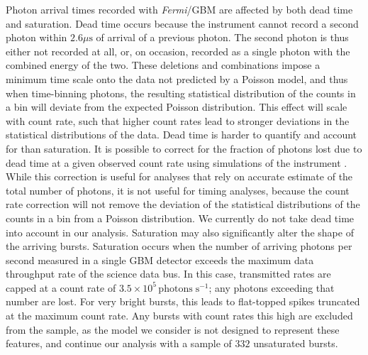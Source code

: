 \documentclass[12pt]{emulateapj}
\newcommand{\project}[1]{\textsl{#1}}
\newcommand{\fermi}{\project{Fermi}}
\begin{document}
Photon arrival times recorded with \fermi/GBM are affected by both dead time and saturation. 
Dead time occurs because the instrument cannot record a second photon within $2.6\mu\mathrm{s}$ of arrival of a previous photon. 
The second photon is thus either not recorded at all, or, on occasion, recorded as a single photon with the combined energy of the two. These deletions and combinations 
impose a minimum time scale onto the data not predicted by a Poisson model, and thus when time-binning photons, the resulting statistical distribution of the counts in a bin will
deviate from the expected Poisson distribution. This effect will scale with count rate, such that higher count rates lead to stronger deviations in the statistical distributions of the data.
Dead time is harder to quantify and account for than saturation. It is possible to correct for the fraction of photons lost due to dead time at a given observed count rate using simulations of the instrument \citep{meegan2009,briggs2010,chaplin2013}. While this correction is useful for analyses that rely on accurate estimate of the total number of photons, it is not useful for timing analyses, because the count rate correction will not remove the deviation of the statistical distributions of the counts in a bin from a Poisson distribution. 
We currently do not take dead time into account in our analysis. Saturation may also significantly alter the shape of the arriving bursts. Saturation occurs when the number of arriving photons per second
measured in a single GBM detector exceeds the maximum data throughput rate of the science data bus. In this case, transmitted rates are capped at a 
count rate of $3.5 \times 10^{5} \, \mathrm{photons} \; \mathrm{s}^{-1}$; any photons exceeding that number are lost. For very bright bursts, this leads
to flat-topped spikes truncated at the maximum count rate. Any bursts with count rates this high are excluded from the sample, as the model we
consider is not designed to represent these features, and continue our analysis with a sample of $332$ unsaturated bursts.
\end{document}
